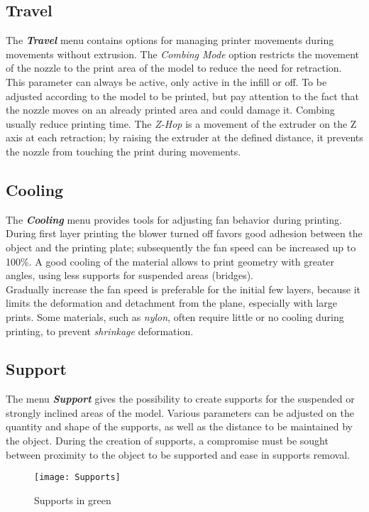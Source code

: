 \subsection{Travel}
The \emph{\textbf{Travel}} menu contains options for managing printer movements during movements without extrusion. The \emph{Combing Mode} option restricts the movement of the nozzle to the print area of the model to reduce the need for retraction. This parameter can always be active, only active in the infill or off. To be adjusted according to the model to be printed, but pay attention to the fact that the nozzle moves on an already printed area and could damage it. Combing usually reduce printing time.
The \emph{Z-Hop} is a movement of the extruder on the Z axis at each retraction; by raising the extruder at the defined distance, it prevents the nozzle from touching the print during movements.

\subsection{Cooling}
The \emph{\textbf{Cooling}} menu provides tools for adjusting fan behavior during printing. During first layer printing the blower turned off favors good adhesion between the object and the printing plate; subsequently the fan speed can be increased up to 100\%. A good cooling of the material allows to print geometry with greater angles, using less supports for suspended areas (bridges). \\ Gradually increase the fan speed is preferable for the initial few layers, because it limits the deformation and detachment from the plane, especially with large prints. Some materials, such as \emph{nylon}, often require little or no cooling during printing, to prevent \emph{shrinkage} deformation.

\subsection{Support}
The menu \emph{\textbf{Support}} gives the possibility to create supports for the suspended or strongly inclined areas of the model. Various parameters can be adjusted on the quantity and shape of the supports, as well as the distance to be maintained by the object. During the creation of supports, a compromise must be sought between proximity to the object to be supported and ease in supports removal.

\begin{figure}[h]
	\centering
	\texttt{[image: Supports]}
    \caption{Supports in green}
    \label{fig:Supports}
\end{figure}

